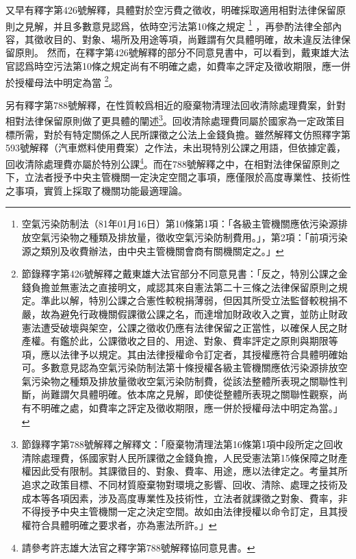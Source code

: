 \documentclass[12pt,a4paper]{article}
\begin{document}
又早有釋字第426號解釋，具體對於空污費之徵收，明確採取適用相對法律保留原則之見解，并且多數意見認爲，依時空污法第10條之規定
\footnote{空氣污染防制法（81年01月16日）第10條第1項：「各級主管機關應依污染源排放空氣污染物之種類及排放量，徵收空氣污染防制費用。」，第2項：「前項污染源之類別及收費辦法，由中央主管機關會商有關機關定之。」}
，再參酌法律全部內容，其徵收目的、對象、場所及用途等項，尚難謂有欠具體明確，故未違反法律保留原則。
然而，在釋字第426號解釋的部分不同意見書中，可以看到，戴東雄大法官認爲時空污法第10條之規定尚有不明確之處，如費率之評定及徵收期限，應一併於授權母法中明定為當
\footnote{節錄釋字第426號解釋之戴東雄大法官部分不同意見書：「反之，特別公課之金錢負擔並無憲法之直接明文，咸認其來自憲法第二十三條之法律保留原則之規定。準此以解，特別公課之合憲性較稅捐薄弱，但因其所受立法監督較稅捐不嚴，故為避免行政機關假課徵公課之名，而達增加財政收入之實，並防止財政憲法遭受破壞與架空，公課之徵收仍應有法律保留之正當性，以確保人民之財產權。有鑑於此，公課徵收之目的、用途、對象、費率評定之原則與期限等項，應以法律予以規定。其由法律授權命令訂定者，其授權應符合具體明確始可。多數意見認為空氣污染防制法第十條授權各級主管機關應依污染源排放空氣污染物之種類及排放量徵收空氣污染防制費，從該法整體所表現之關聯性判斷，尚難謂欠具體明確。依本席之見解，即使從整體所表現之關聯性觀察，尚有不明確之處，如費率之評定及徵收期限，應一併於授權母法中明定為當。」}。



另有釋字第788號解釋，在性質較爲相近的廢棄物清理法回收清除處理費案，針對相對法律保留原則做了更具體的闡述\footnote{節錄釋字第788號解釋之解釋文：「廢棄物清理法第16條第1項中段所定之回收清除處理費，係國家對人民所課徵之金錢負擔，人民受憲法第15條保障之財產權因此受有限制。其課徵目的、對象、費率、用途，應以法律定之。考量其所追求之政策目標、不同材質廢棄物對環境之影響、回收、清除、處理之技術及成本等各項因素，涉及高度專業性及技術性，立法者就課徵之對象、費率，非不得授予中央主管機關一定之決定空間。故如由法律授權以命令訂定，且其授權符合具體明確之要求者，亦為憲法所許。」}。回收清除處理費同屬於國家為一定政策目標所需，對於有特定關係之人民所課徵之公法上金錢負擔。雖然解釋文仿照釋字第593號解釋（汽車燃料使用費案）之作法，未出現特別公課之用語，但依據定義，回收清除處理費亦屬於特別公課\footnote{請參考許志雄大法官之釋字第788號解釋協同意見書。}。而在788號解釋之中，在相對法律保留原則之下，立法者授予中央主管機關一定決定空間之事項，應僅限於高度專業性、技術性之事項，實質上採取了機關功能最適理論。
\end{document}
